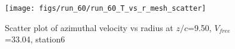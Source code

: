 \begin{figure}[H]
\centering
\texttt{[image: figs/run\_60/run\_60\_T\_vs\_r\_mesh\_scatter]}
\caption{Scatter plot of azimuthal velocity vs radius at $z/c$=9.50, $V_{free}$=33.04, station6}
\label{fig:run_60_T_vs_r_mesh_scatter}
\end{figure}


